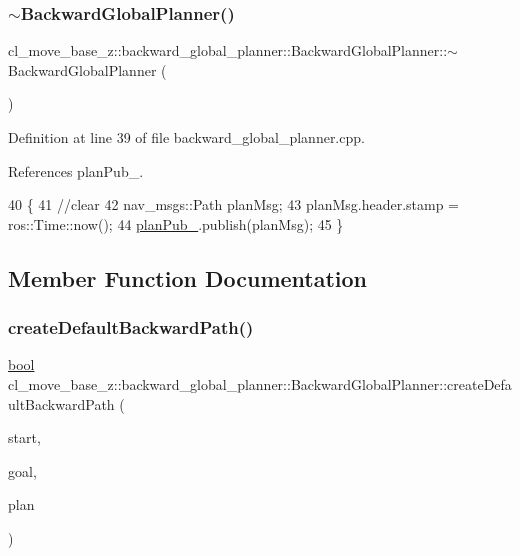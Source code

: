 \subsubsection{\texorpdfstring{$\sim$\+Backward\+Global\+Planner()}{~BackwardGlobalPlanner()}}
{\footnotesize\ttfamily cl\+\_\+move\+\_\+base\+\_\+z\+::backward\+\_\+global\+\_\+planner\+::\+Backward\+Global\+Planner\+::$\sim$\+Backward\+Global\+Planner (\begin{DoxyParamCaption}{ }\end{DoxyParamCaption})\hspace{0.3cm}{\ttfamily [virtual]}}



Definition at line 39 of file backward\+\_\+global\+\_\+planner.\+cpp.



References plan\+Pub\+\_\+.


\begin{DoxyCode}
40 \{
41     \textcolor{comment}{//clear}
42     nav\_msgs::Path planMsg;
43     planMsg.header.stamp = ros::Time::now();
44     \hyperlink{classcl__move__base__z_1_1backward__global__planner_1_1BackwardGlobalPlanner_a561eab039140948c52ec928c191f3f43}{planPub\_}.publish(planMsg);
45 \}
\end{DoxyCode}


\subsection{Member Function Documentation}
\mbox{\label{classcl__move__base__z_1_1backward__global__planner_1_1BackwardGlobalPlanner_a1b4d2eb717f9f63f2309def37c6ce297}} 
\subsubsection{\texorpdfstring{create\+Default\+Backward\+Path()}{createDefaultBackwardPath()}}
{\footnotesize\ttfamily \hyperlink{classbool}{bool} cl\+\_\+move\+\_\+base\+\_\+z\+::backward\+\_\+global\+\_\+planner\+::\+Backward\+Global\+Planner\+::create\+Default\+Backward\+Path (\begin{DoxyParamCaption}\item[{const geometry\+\_\+msgs\+::\+Pose\+Stamped \&}]{start,  }\item[{const geometry\+\_\+msgs\+::\+Pose\+Stamped \&}]{goal,  }\item[{std\+::vector$<$ geometry\+\_\+msgs\+::\+Pose\+Stamped $>$ \&}]{plan }\end{DoxyParamCaption})\hspace{0.3cm}{\ttfamily [virtual]}}

